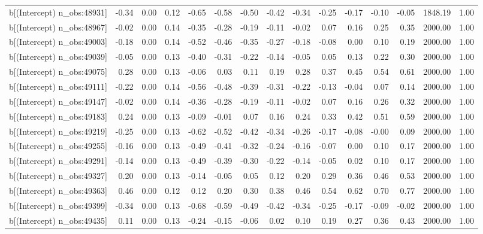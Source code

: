 \begin{table}[ht]
\begin{tabular}{rrrrrrrrrrrrrrr}
  b[(Intercept) n\_obs:48931] & -0.34 & 0.00 & 0.12 & -0.65 & -0.58 & -0.50 & -0.42 & -0.34 & -0.25 & -0.17 & -0.10 & -0.05 & 1848.19 & 1.00 \\ 
  b[(Intercept) n\_obs:48967] & -0.02 & 0.00 & 0.14 & -0.35 & -0.28 & -0.19 & -0.11 & -0.02 & 0.07 & 0.16 & 0.25 & 0.35 & 2000.00 & 1.00 \\ 
  b[(Intercept) n\_obs:49003] & -0.18 & 0.00 & 0.14 & -0.52 & -0.46 & -0.35 & -0.27 & -0.18 & -0.08 & 0.00 & 0.10 & 0.19 & 2000.00 & 1.00 \\ 
  b[(Intercept) n\_obs:49039] & -0.05 & 0.00 & 0.13 & -0.40 & -0.31 & -0.22 & -0.14 & -0.05 & 0.05 & 0.13 & 0.22 & 0.30 & 2000.00 & 1.00 \\ 
  b[(Intercept) n\_obs:49075] & 0.28 & 0.00 & 0.13 & -0.06 & 0.03 & 0.11 & 0.19 & 0.28 & 0.37 & 0.45 & 0.54 & 0.61 & 2000.00 & 1.00 \\ 
  b[(Intercept) n\_obs:49111] & -0.22 & 0.00 & 0.14 & -0.56 & -0.48 & -0.39 & -0.31 & -0.22 & -0.13 & -0.04 & 0.07 & 0.14 & 2000.00 & 1.00 \\ 
  b[(Intercept) n\_obs:49147] & -0.02 & 0.00 & 0.14 & -0.36 & -0.28 & -0.19 & -0.11 & -0.02 & 0.07 & 0.16 & 0.26 & 0.32 & 2000.00 & 1.00 \\ 
  b[(Intercept) n\_obs:49183] & 0.24 & 0.00 & 0.13 & -0.09 & -0.01 & 0.07 & 0.16 & 0.24 & 0.33 & 0.42 & 0.51 & 0.59 & 2000.00 & 1.00 \\ 
  b[(Intercept) n\_obs:49219] & -0.25 & 0.00 & 0.13 & -0.62 & -0.52 & -0.42 & -0.34 & -0.26 & -0.17 & -0.08 & -0.00 & 0.09 & 2000.00 & 1.00 \\ 
  b[(Intercept) n\_obs:49255] & -0.16 & 0.00 & 0.13 & -0.49 & -0.41 & -0.32 & -0.24 & -0.16 & -0.07 & 0.00 & 0.10 & 0.17 & 2000.00 & 1.00 \\ 
  b[(Intercept) n\_obs:49291] & -0.14 & 0.00 & 0.13 & -0.49 & -0.39 & -0.30 & -0.22 & -0.14 & -0.05 & 0.02 & 0.10 & 0.17 & 2000.00 & 1.00 \\ 
  b[(Intercept) n\_obs:49327] & 0.20 & 0.00 & 0.13 & -0.14 & -0.05 & 0.05 & 0.12 & 0.20 & 0.29 & 0.36 & 0.46 & 0.53 & 2000.00 & 1.00 \\ 
  b[(Intercept) n\_obs:49363] & 0.46 & 0.00 & 0.12 & 0.12 & 0.20 & 0.30 & 0.38 & 0.46 & 0.54 & 0.62 & 0.70 & 0.77 & 2000.00 & 1.00 \\ 
  b[(Intercept) n\_obs:49399] & -0.34 & 0.00 & 0.13 & -0.68 & -0.59 & -0.49 & -0.42 & -0.34 & -0.25 & -0.17 & -0.09 & -0.02 & 2000.00 & 1.00 \\ 
  b[(Intercept) n\_obs:49435] & 0.11 & 0.00 & 0.13 & -0.24 & -0.15 & -0.06 & 0.02 & 0.10 & 0.19 & 0.27 & 0.36 & 0.43 & 2000.00 & 1.00 \\ 

\end{tabular}
\end{table}
